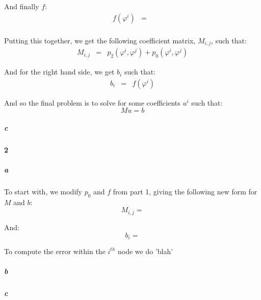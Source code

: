 \documentclass{article}
\begin{document}
And finally $f$:
\begin{eqnarray*}
f(\varphi^i) & = & \\
\end{eqnarray*}

Putting this together, we get the following coefficient matrix, $M_{i,j}$, such that:
\begin{eqnarray*}
M_{i,j} & = & p_2(\varphi^i, \varphi^j) + p_0(\varphi^i, \varphi^j)
\end{eqnarray*}

And for the right hand side, we get $b_i$ such that:
\begin{eqnarray*}
b_i & = & f(\varphi^i)
\end{eqnarray*}

And so the final problem is to solve for some coefficients $u^i$ such that:
\[ M u = b \]

\subparagraph{c}

\paragraph{2}

\subparagraph{a}

To start with, we modify $p_0$ and $f$ from part 1, giving the following new form for $M$ and $b$:
\[ M_{i,j} = \]

And:
\[ b_i = \]

To compute the error within the $i^{th}$ node we do 'blah'

\subparagraph{b}

\subparagraph{c}
\end{document}
